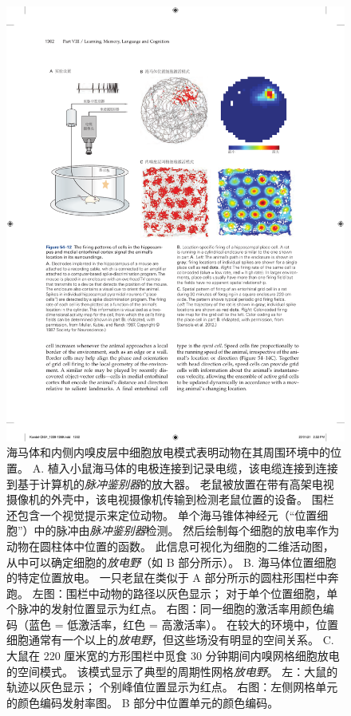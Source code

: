\begin{figure}[htbp]
	\centering
	\includegraphics[width=1.0\linewidth]{chap54/fig_54_12}
	\caption{海马体和内侧内嗅皮层中细胞放电模式表明动物在其周围环境中的位置。
		A. 植入小鼠海马体的电极连接到记录电缆，该电缆连接到连接到基于计算机的\textit{脉冲鉴别器}的放大器。
		老鼠被放置在带有高架电视摄像机的外壳中，该电视摄像机传输到检测老鼠位置的设备。
		围栏还包含一个视觉提示来定位动物。
		单个海马锥体神经元（“位置细胞”）中的脉冲由\textit{脉冲鉴别器}检测。
		然后绘制每个细胞的放电率作为动物在圆柱体中位置的函数。
		此信息可视化为细胞的二维活动图，从中可以确定细胞的\textit{放电野}（如 B 部分所示）\cite{muller1987spatial}。
		B. 海马体位置细胞的特定位置放电。
		一只老鼠在类似于 A 部分所示的圆柱形围栏中奔跑。
		左图：围栏中动物的路径以灰色显示；
		对于单个位置细胞，单个脉冲的发射位置显示为红点。
		右图：同一细胞的激活率用颜色编码（蓝色 = 低激活率，红色 = 高激活率）。
		在较大的环境中，位置细胞通常有一个以上的\textit{放电野}，但这些场没有明显的空间关系。
		C. 大鼠在 220 厘米宽的方形围栏中觅食 30 分钟期间内嗅网格细胞放电的空间模式。
		该模式显示了典型的周期性网格\textit{放电野}。
		左：大鼠的轨迹以灰色显示；
		个别峰值位置显示为红点。
		右图：左侧网格单元的颜色编码发射率图。
		B 部分中位置单元的颜色编码\cite{stensola2012entorhinal}。}
	\label{fig:54_12}
\end{figure}



